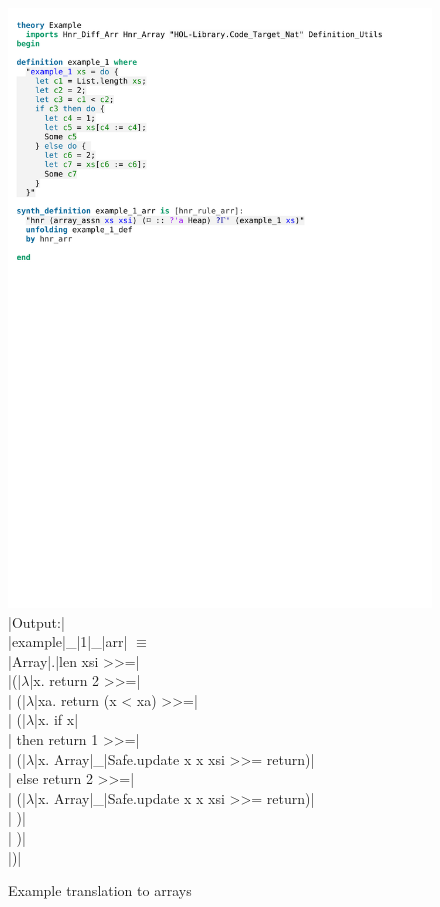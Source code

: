 \begin{figure}[htpb]
    \includegraphics[trim={0 18cm 0 9,8cm}, clip, width=1.00\textwidth]{figures/Theory_Example.pdf}
    {
    \footnotesize
    |Output:|\\
    |example|\_|1|\_|arr| $\equiv$ \\
    |Array|.|len xsi >>=| \\
    |(|$\lambda$|x. return 2 >>=| \\
    |   (|$\lambda$|xa. return (x < xa) >>=| \\
    |       (|$\lambda$|x. if x| \\
    |           then return 1 >>=| \\
    |               (|$\lambda$|x. Array|\_|Safe.update x x xsi >>= return)| \\
    |           else return 2 >>=| \\
    |               (|$\lambda$|x. Array|\_|Safe.update x x xsi >>= return)|\\
    |       )|\\
    |    )|\\
    |)|
    }
    
    \caption[Example translation to arrays]{Example translation to arrays}
    \label{fig:hnr_array_example}
\end{figure}

